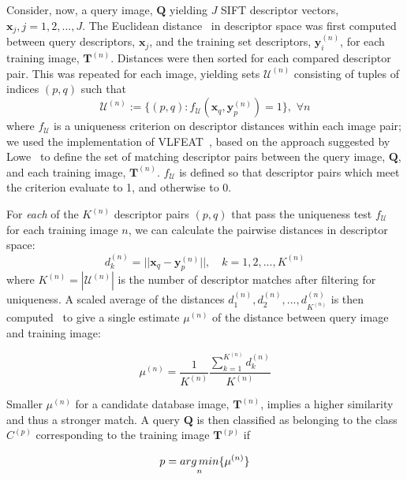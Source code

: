 Consider, now, a query image, $\mathbf{Q}$ yielding $J$ SIFT descriptor vectors, $\mathbf{x}_j, j = 1,2,...,J$. The Euclidean distance~\cite{Vedaldi2008} in descriptor space was first computed between query descriptors, $\mathbf{x}_j$, and the training set descriptors, $\mathbf{y}_i^{(n)}$, for each training image, $\mathbf{T}^{(n)}$. Distances were then sorted for each compared descriptor pair.  This was repeated for each image, yielding sets $\mathcal{U}^{(n)}$ consisting of tuples of indices $(p,q)$ such that
\[
\mathcal{U}^{(n)} := \lbrace (p,q): f_\mathcal{U}(\mathbf{x}_q,\mathbf{y}_p^{(n)})=1\rbrace,\,\,\forall n
\]
where $f_{\mathcal{U}}$ is a uniqueness criterion on descriptor distances within each image pair; we used the implementation of VLFEAT~\cite{Vedaldi2008}, based on the approach suggested by Lowe~\cite{Lowe2004} to define the set of matching descriptor pairs between the query image, $\mathbf{Q}$, and each training image, $\mathbf{T}^{(n)}$. $f_{\mathcal{U}}$ is defined so that descriptor pairs which meet the criterion evaluate to 1, and otherwise to 0. 

For {\em each} of the $K^{(n)}$ descriptor pairs $(p,q)$ that pass the uniqueness test $f_{\mathcal{U}}$ for each training image $n$, we can calculate the pairwise distances in descriptor space:
\begin{equation}
d_k^{(n)} =  ||\mathbf{x}_q-\mathbf{y}_p^{(n)}||, \quad k = 1,2,...,K^{(n)}
\label{EucDistance}
\end{equation}
where $K^{(n)} = |\mathcal{U}^{(n)}|$ is the number of descriptor matches after filtering for uniqueness. A scaled average of the distances $d_1^{(n)},d_2^{(n)},...,d_{K^{(n)}}^{(n)}$ is then computed~\cite{Li2009} to give a single estimate $\mu^{(n)}$ of the distance between query image and training image:

\begin{equation}
\mu^{(n)} = \frac{1}{K^{(n)}}\frac{\sum_{k=1}^{K^{(n)}} d_k^{(n)}}{K^{(n)}}
\label{eqScore}
\end{equation}

Smaller $\mu^{(n)}$ for a candidate database image, $\mathbf{T}^{(n)}$, implies a higher similarity and thus a stronger match.
A query $\textbf{Q}$ is then classified as belonging to the class $C^{(p)}$ corresponding to the training image $\mathbf{T}^{(p)}$ if

\begin{equation}
p = \underset{n}{arg\,min}\lbrace \mu^{(n)}\rbrace
\end{equation}

